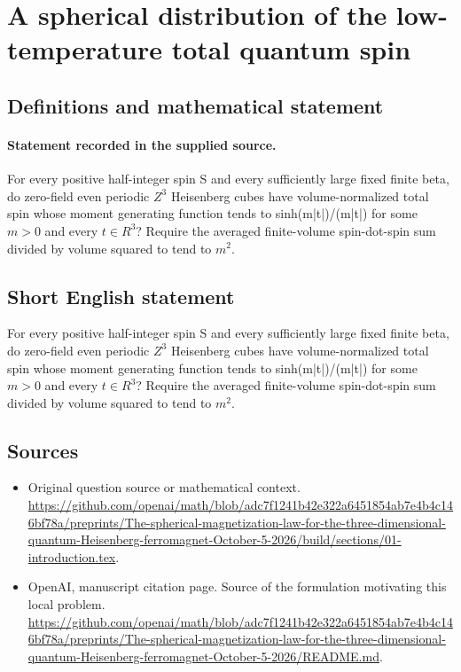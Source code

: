 \documentclass[11pt]{article}
\begin{document}
\section*{A spherical distribution of the low-temperature total quantum spin}\label{30007228}
\subsection{Definitions and mathematical statement}
\paragraph{Statement recorded in the supplied source.}
For every positive half-integer spin S and every sufficiently large fixed finite beta, do zero-field even periodic $Z^3$ Heisenberg cubes have volume-normalized total spin whose moment generating function tends to sinh(m|t|)/(m|t|) for some $m>0$ and every $t\in R^3$? Require the averaged finite-volume spin-dot-spin sum divided by volume squared to tend to $m^2$.
\subsection{Short English statement}
For every positive half-integer spin S and every sufficiently large fixed finite beta, do zero-field even periodic $Z^3$ Heisenberg cubes have volume-normalized total spin whose moment generating function tends to sinh(m|t|)/(m|t|) for some $m>0$ and every $t\in R^3$? Require the averaged finite-volume spin-dot-spin sum divided by volume squared to tend to $m^2$.
\subsection{Sources}
\begin{itemize}
\item[S1] Original question source or mathematical context.
\url{https://github.com/openai/math/blob/adc7f1241b42e322a6451854ab7e4b4c146bf78a/preprints/The-spherical-magnetization-law-for-the-three-dimensional-quantum-Heisenberg-ferromagnet-October-5-2026/build/sections/01-introduction.tex}.
\item[S2] OpenAI, manuscript citation page. Source of the formulation motivating this local problem.
\url{https://github.com/openai/math/blob/adc7f1241b42e322a6451854ab7e4b4c146bf78a/preprints/The-spherical-magnetization-law-for-the-three-dimensional-quantum-Heisenberg-ferromagnet-October-5-2026/README.md}.
\end{itemize}
\end{document}
